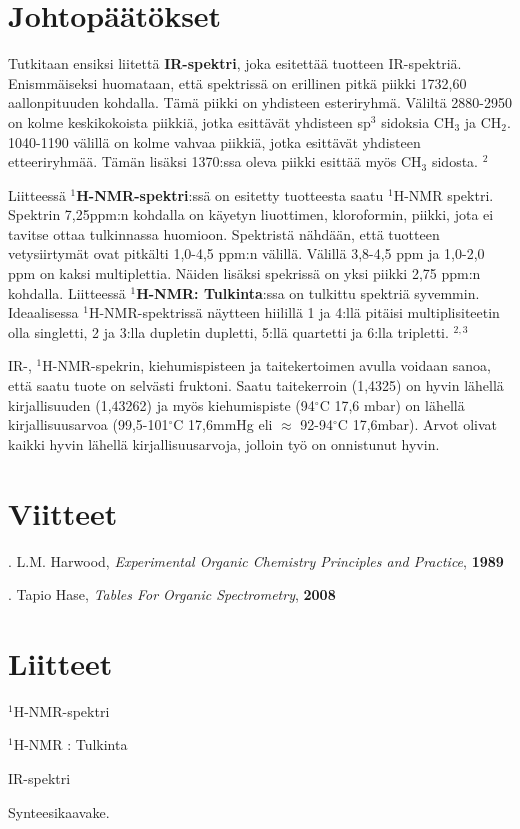 \documentclass[11pt,a4paper]{article}
\begin{document}
\section{Johtopäätökset}
 
 Tutkitaan ensiksi liitettä \textbf{IR-spektri}, joka esitettää tuotteen IR-spektriä. Enismmäiseksi huomataan, että spektrissä on erillinen pitkä piikki 1732,60 aallonpituuden kohdalla. Tämä piikki on yhdisteen esteriryhmä. Väliltä 2880-2950 on kolme keskikokoista piikkiä, jotka esittävät yhdisteen sp$^3$ sidoksia CH$_3$ ja CH$_2$. 1040-1190 välillä on kolme vahvaa piikkiä, jotka esittävät yhdisteen etteeriryhmää. Tämän lisäksi 1370:ssa oleva piikki esittää myös CH$_3$ sidosta. $^2$
 
 Liitteessä \textbf{$^1$H-NMR-spektri}:ssä on esitetty tuotteesta saatu $^1$H-NMR spektri. Spektrin 7,25ppm:n kohdalla on käyetyn liuottimen, kloroformin, piikki, jota ei tavitse ottaa tulkinnassa huomioon. Spektristä nähdään, että tuotteen vetysiirtymät ovat pitkälti 1,0-4,5 ppm:n välillä. Välillä 3,8-4,5 ppm ja 1,0-2,0 ppm on kaksi multiplettia. Näiden lisäksi spekrissä on yksi piikki 2,75 ppm:n kohdalla. Liitteessä \textbf{$^1$H-NMR: Tulkinta}:ssa on tulkittu spektriä syvemmin. Ideaalisessa $^1$H-NMR-spektrissä näytteen hiilillä 1 ja 4:llä pitäisi multiplisiteetin olla singletti, 2 ja 3:lla dupletin dupletti, 5:llä quartetti ja 6:lla tripletti. $^{2,3}$
 
 IR-, $^1$H-NMR-spekrin, kiehumispisteen ja taitekertoimen avulla voidaan sanoa, että saatu tuote on selvästi fruktoni. Saatu taitekerroin (1,4325) on hyvin lähellä kirjallisuuden (1,43262) ja myös kiehumispiste (94$^\circ$C 17,6 mbar) on lähellä kirjallisuusarvoa (99,5-101$^\circ$C 17,6mmHg eli $\approx$ 92-94$^\circ$C 17,6mbar).  Arvot olivat kaikki hyvin lähellä kirjallisuusarvoja, jolloin työ on onnistunut hyvin. 
 
 \pagebreak
 
 \section{Viitteet}
 
 . L.M. Harwood, \textit{Experimental Organic Chemistry Principles and Practice}, \textbf{1989}
 
 . Tapio Hase, \textit{Tables For Organic Spectrometry}, \textbf{2008}
 
 \section{Liitteet}
 
 \noindent $^1$H-NMR-spektri
 
 \noindent $^1$H-NMR : Tulkinta
 
 \noindent IR-spektri
 
 \noindent Synteesikaavake.
 
 
 
\end{document}
